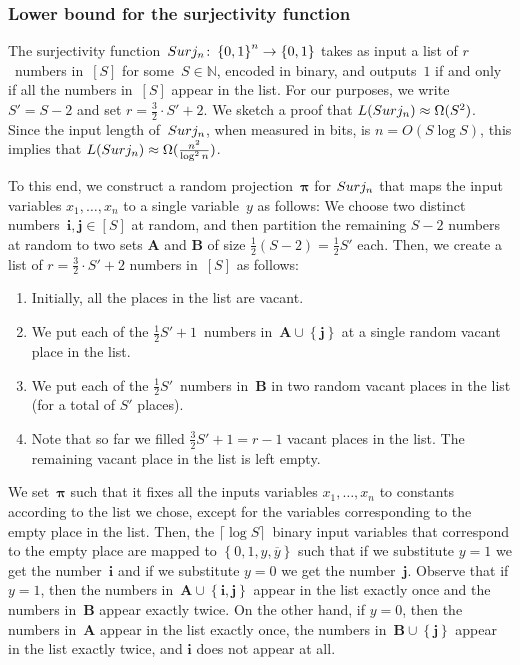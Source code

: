 \documentclass[11pt]{article}
\numberwithin{equation}{section}
\theoremstyle{definition}
\theoremstyle{plain}
\newcommand{\N}{\mathbb N}
\theoremstyle{definition}\newtheorem{notation}[theorem]{Notation}\theoremstyle{plain}
\renewcommand{\N}{\mathbb{N}}
\newcommand{\B}{\left\{ 0,1 \right \}}
\newcommand{\p}{\boldsymbol{\pi}}
\newcommand{\surj}{\textup{\textsf{Surj}}}
\newcommand{\A}{\boldsymbol{A}}
\newcommand{\bB}{\boldsymbol{B}}
\renewcommand{\i}{\boldsymbol{i}}
\renewcommand{\j}{\boldsymbol{j}}
\theoremstyle{definition}
\theoremstyle{plain}
\begin{document}
\subsubsection{Lower bound for the surjectivity function}

The surjectivity function~$\surj_{n}\colon\B^{n}\to\B$ \cite{BM12} takes
as input a list of $r$~numbers in~$\left[S\right]$ for some~$S\in\N$,
encoded in binary, and outputs~$1$ if and only if all the numbers
in~$\left[S\right]$ appear in the list. For our purposes, we 
%
write %
$S'=S-2$ and set $r=\frac{3}{2}\cdot S'+2$. We sketch a proof that
$L(\surj_{n})\approx\Omega(S^{2})$. Since the input length of~$\surj_{n}$,
%
when measured in bits, is $n=O(S\log S)$, this implies that $L(\surj_{n})\approx\Omega(\frac{n^{2}}{\log^{2}n})$.

To this end, we construct a random projection~$\p$ for $\surj_{n}$
that maps the input variables $x_{1},\ldots,x_{n}$ to a single variable~$y$
as follows: We choose two distinct numbers~$\i,\j\in\left[S\right]$ at random,
and then partition the remaining $S-2$ numbers at random to two sets
$\A$ and $\bB$ of size $\frac{1}{2}(S-2)=\frac{1}{2}S'$ each. Then,
we create a list of $r=\frac{3}{2}\cdot S'+2$ numbers in~$\left[S\right]$
as follows:
\begin{enumerate}
\item Initially, all the places in the list are vacant.

\item We put each of the $\frac{1}{2}S'+1$~numbers in~$\A\cup\left\{ \j\right\} $
at a single random vacant place in the list.
\item We put each of the $\frac{1}{2}S'$~numbers in~$\bB$ in two random vacant
places in the list (for a total of $S'$ places).
\item Note that so far we filled $\frac{3}{2}S'+1=r-1$ vacant places in the list.
The remaining vacant place in the list is left empty.
\end{enumerate}
We set~$\p$ such that it fixes all the inputs variables $x_{1},\ldots,x_{n}$
to constants according to the list we chose, except for the variables
corresponding to the empty place in the list. Then, the $\lceil \log S \rceil$~binary input variables
that correspond to the empty place are mapped to $\left\{ 0,1,y,\overline{y}\right\} $
such that if we substitute $y=1$ we get the number~$\i$ and if
we substitute $y=0$ we get the number~$\j$. Observe that if $y=1$,
then the numbers in~$\A\cup\left\{ \i,\j\right\} $ appear in the
list exactly once and the numbers in~$\bB$ appear exactly twice.
On the other hand, if $y=0$, then the numbers in~$\A$ appear in
the list exactly once, the numbers in~$\bB\cup\left\{ \j\right\} $
appear in the list exactly twice, and $\i$ does not appear at all.
\end{document}
